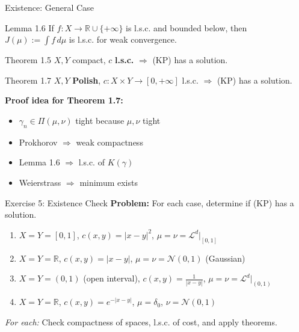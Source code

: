 \documentclass[aspectratio=169]{beamer}
\newcommand{\R}{\mathbb{R}}
\newcommand{\Ld}{\mathcal{L}^d}
\begin{document}
\begin{frame}{Existence: General Case}
\begin{block}{Lemma 1.6}
If $f: X \to \R \cup \{+\infty\}$ is l.s.c. and bounded below, then
$J(\mu) := \int f \, d\mu$ is l.s.c. for weak convergence.
\end{block}

\vspace{0.3cm}
\begin{block}{Theorem 1.5}
$X, Y$ compact, $c$ \textbf{l.s.c.} $\Rightarrow$ (KP) has a solution.
\end{block}

\vspace{0.3cm}
\begin{block}{Theorem 1.7}
$X, Y$ \textbf{Polish}, $c: X \times Y \to [0, +\infty]$ l.s.c. $\Rightarrow$ (KP) has a solution.
\end{block}

\vspace{0.3cm}
\textbf{Proof idea for Theorem 1.7:}
\begin{itemize}
    \item $\gamma_n \in \Pi(\mu,\nu)$ tight because $\mu, \nu$ tight
    \item Prokhorov $\Rightarrow$ weak compactness
    \item Lemma 1.6 $\Rightarrow$ l.s.c. of $K(\gamma)$
    \item Weierstrass $\Rightarrow$ minimum exists
\end{itemize}
\end{frame}

\begin{frame}{Exercise 5: Existence Check}
\textbf{Problem:} For each case, determine if (KP) has a solution.

\vspace{0.3cm}
\begin{enumerate}
    \item[(a)] $X = Y = [0,1]$, $c(x,y) = |x-y|^2$, $\mu = \nu = \Ld|_{[0,1]}$

    \vspace{0.2cm}
    \item[(b)] $X = Y = \R$, $c(x,y) = |x-y|$, $\mu = \nu = \mathcal{N}(0,1)$ (Gaussian)

    \vspace{0.2cm}
    \item[(c)] $X = Y = (0,1)$ (open interval), $c(x,y) = \frac{1}{|x-y|}$, $\mu = \nu = \Ld|_{(0,1)}$

    \vspace{0.2cm}
    \item[(d)] $X = Y = \R$, $c(x,y) = e^{-|x-y|}$, $\mu = \delta_0$, $\nu = \mathcal{N}(0,1)$
\end{enumerate}

\vspace{0.3cm}
\textit{For each:} Check compactness of spaces, l.s.c. of cost, and apply theorems.
\end{frame}
\end{document}
